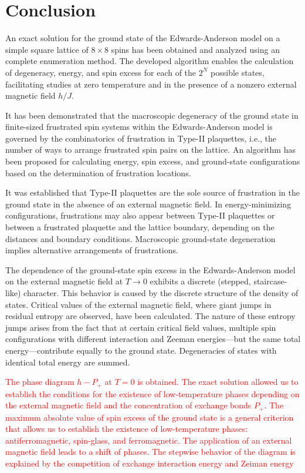 \documentclass[preprint,12pt]{elsarticle}
\begin{document}
	\section{Conclusion}
	
	An exact solution for the ground state of the Edwards-Anderson model on a simple square lattice of $8 \times 8$ spins has been obtained and analyzed using an complete enumeration method. The developed algorithm enables the calculation of degeneracy, energy, and spin excess for each of the $2^N$ possible states, facilitating studies at zero temperature and in the presence of a nonzero external magnetic field $h/J$.
	
	It has been demonstrated that the macroscopic degeneracy of the ground state in finite-sized frustrated spin systems within the Edwards-Anderson model is governed by the combinatorics of frustration in  Type-II plaquettes, i.e., the number of ways to arrange frustrated spin pairs on the lattice. An algorithm has been proposed for calculating energy, spin excess, and ground-state configurations based on the determination of frustration locations.
	
	It was established that Type-II plaquettes are the sole source of frustration in the ground state in the absence of an external magnetic field. In energy-minimizing configurations, frustrations may also appear between Type-II plaquettes or between a frustrated plaquette and the lattice boundary, depending on the distances and boundary conditions. Macroscopic ground-state degeneration implies alternative arrangements of frustrations.
	
	The dependence of the ground-state spin excess in the Edwards-Anderson model on the external magnetic field at $T \to 0$ exhibits a discrete (stepped, staircase-like) character. This behavior is caused by the discrete structure of the density of states. Critical values of the external magnetic field, where giant jumps in residual entropy are observed, have been calculated. The nature of these entropy jumps arises from the fact that at certain critical field values, multiple spin configurations with different interaction and Zeeman energies—but the same total energy—contribute equally to the ground state. Degeneracies of states with identical total energy are summed.
	
	\textcolor{red}{The phase diagram $h - P_+$ at $T = 0$ is obtained. The exact solution allowed us to establish the conditions for the existence of low-temperature phases depending on the external magnetic field and the concentration of exchange bonds $P_+$. The maximum absolute value of spin excess of the ground state is a general criterion that allows us to establish the existence of low-temperature phases: antiferromagnetic, spin-glass, and ferromagnetic. The application of an external magnetic field leads to a shift of phases. The stepwise behavior of the diagram is explained by the competition of exchange interaction energy and Zeiman energy}
	
\end{document}
